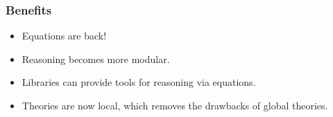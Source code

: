 \documentclass[usenames,dvipsnames]{beamer}
\begin{document}
\begin{frame}
	\frametitle{Benefits}
	\begin{itemize}
		\item Equations are back!
		\item Reasoning becomes more modular.
		\item Libraries can provide tools for reasoning via equations.
		\item Theories are now local, which removes the drawbacks of global theories.
	\end{itemize}
\end{frame}
\end{document}
